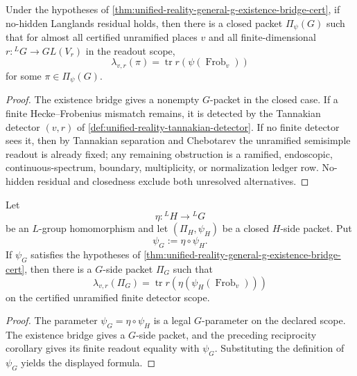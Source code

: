 \begin{corollary}
\label{cor:unified-reality-general-g-reciprocity-existence-bridge}
Under the hypotheses of
\autoref{thm:unified-reality-general-g-existence-bridge-cert}, if
no-hidden Langlands residual holds, then there is a closed packet
$\Pi_\psi(G)$ such that for almost all certified unramified places $v$
and all finite-dimensional $r:{}^LG\to GL(V_r)$ in the readout scope,
$$
\lambda_{v,r}(\pi)
=
\operatorname{tr}r(\psi(\operatorname{Frob}_v))
$$
for some $\pi\in\Pi_\psi(G)$.
\end{corollary}
\begin{proof}
The existence bridge gives a nonempty $G$-packet in the closed case. If
a finite Hecke--Frobenius mismatch remains, it is detected by the
Tannakian detector $(v,r)$ of
\autoref{def:unified-reality-tannakian-detector}. If no finite detector
sees it, then by Tannakian separation and Chebotarev the unramified
semisimple readout is already fixed; any remaining obstruction is a
ramified, endoscopic, continuous-spectrum, boundary, multiplicity, or
normalization ledger row. No-hidden residual and closedness exclude
both unresolved alternatives.
\end{proof}

\begin{corollary}
\label{cor:unified-reality-general-g-functoriality-existence-bridge}
Let
$$
\eta:{}^LH\to{}^LG
$$
be an $L$-group homomorphism and let $(\Pi_H,\psi_H)$ be a closed
$H$-side packet. Put
$$
\psi_G:=\eta\circ\psi_H.
$$
If $\psi_G$ satisfies the hypotheses of
\autoref{thm:unified-reality-general-g-existence-bridge-cert}, then
there is a $G$-side packet $\Pi_G$ such that
$$
\lambda_{v,r}(\Pi_G)
=
\operatorname{tr}r(\eta(\psi_H(\operatorname{Frob}_v)))
$$
on the certified unramified finite detector scope.
\end{corollary}
\begin{proof}
The parameter $\psi_G=\eta\circ\psi_H$ is a legal $G$-parameter on the
declared scope. The existence bridge gives a $G$-side packet, and the
preceding reciprocity corollary gives its finite readout equality with
$\psi_G$. Substituting the definition of $\psi_G$ yields the displayed
formula.
\end{proof}

